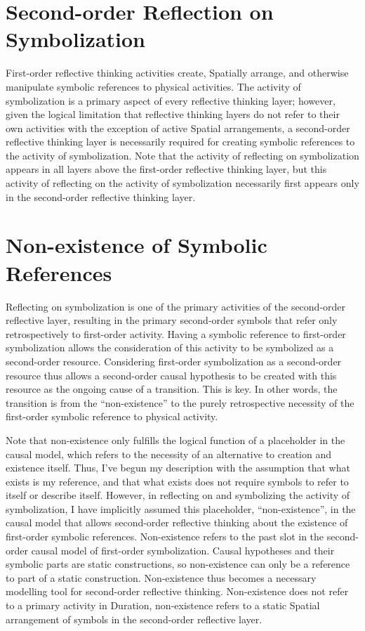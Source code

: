 \section{Second-order Reflection on Symbolization}

First-order reflective thinking activities create, Spatially arrange,
and otherwise manipulate symbolic references to physical activities.
The activity of symbolization is a primary aspect of every reflective
thinking layer; however, given the logical limitation that reflective
thinking layers do not refer to their own activities with the
exception of active Spatial arrangements, a second-order reflective
thinking layer is necessarily required for creating symbolic
references to the activity of symbolization.  Note that the activity
of reflecting on symbolization appears in all layers above the
first-order reflective thinking layer, but this activity of reflecting
on the activity of symbolization necessarily first appears only in the
second-order reflective thinking layer.

\section{Non-existence of Symbolic References}

Reflecting on symbolization is one of the primary activities of the
second-order reflective layer, resulting in the primary second-order
symbols that refer only retrospectively to first-order activity.
Having a symbolic reference to first-order symbolization allows the
consideration of this activity to be symbolized as a second-order
resource.  Considering first-order symbolization as a second-order
resource thus allows a second-order causal hypothesis to be created
with this resource as the ongoing cause of a transition.  This is key.
In other words, the transition is from the ``non-existence'' to the
purely retrospective necessity of the first-order symbolic reference
to physical activity.

Note that non-existence only fulfills the logical function of a
placeholder in the causal model, which refers to the necessity of an
alternative to creation and existence itself.  Thus, I've begun my
description with the assumption that what exists is my reference, and
that what exists does not require symbols to refer to itself or
describe itself.  However, in reflecting on and symbolizing the
activity of symbolization, I have implicitly assumed this placeholder,
``non-existence'', in the causal model that allows second-order
reflective thinking about the existence of first-order symbolic
references.  Non-existence refers to the past slot in the second-order
causal model of first-order symbolization.  Causal hypotheses and
their symbolic parts are static constructions, so non-existence can
only be a reference to part of a static construction.  Non-existence
thus becomes a necessary modelling tool for second-order reflective
thinking.  Non-existence does not refer to a primary activity in
Duration, non-existence refers to a static Spatial arrangement of
symbols in the second-order reflective layer.

